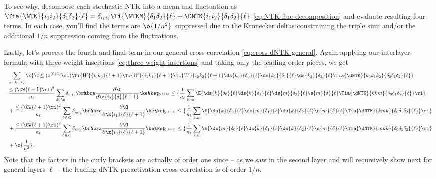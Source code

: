  To see why, decompose each stochastic NTK into a mean and fluctuation as $\Tia{\NTK}{i_1i_2}{\delta_1\delta_2}{\ell}=\delta_{i_1i_2}\Ti{\NTKM}{\delta_1\delta_2}{\ell}+\DNTK{i_1i_2}{\delta_1\delta_2}{\ell}$ \eqref{eq:NTK-fluc-decomposition} and evaluate resulting four terms. In each case, you'll find the terms are $\o{1/n^2}$ suppressed due to the  Kronecker deltas constraining the triple sum and/or the additional $1/n$ suppression coming from the fluctuations.






Lastly, let's process the fourth and final term in our general cross correlation \eqref{eq:cross-dNTK-general}. Again applying our interlayer formula with three weight insertions \eqref{eq:three-weight-insertions} and taking only the leading-order pieces,
we get
\begin{align}\label{eq:dNTK-cross-correlation-contribution-3}
&\sum_{k_0,k_1,k_2}\E{\O\!\le(z^{(\ell+1)}\ri)\Ti{W}{i_0 k_0}{\ell+1}\Ti{W}{i_1 k_1}{\ell+1}\Ti{W}{i_2 k_2}{\ell+1}\ds{k_0}{\delta_0}{\ell}\ds{k_1}{\delta_1}{\ell}\ds{k_2}{\delta_2}{\ell}\Tia{\dNTK}{k_0k_1k_2}{\delta_0\delta_1\delta_2}{\ell}}\, \notag \\
=&\frac{\le(\CW{\ell+1}\ri)^2}{n_{\ell}}\sum_{\delta_{}\in\D}\delta_{i_0i_1}\bra\!\!\!\bra\frac{\partial \O}{\partial \z{i_2}{\delta_{}}{\ell+1}} \ket\!\!\!\ket_{\!\!\!G^{(\ell+1)}}\le\{\frac{1}{n_{\ell}}\sum_{k,m}\E{\ds{k}{\delta_0}{\ell}\ds{k}{\delta_1}{\ell}\ds{m}{\delta_2}{\ell}\s{m}{\delta_{}}{\ell} \Tia{\dNTK}{kkm}{\delta_0\delta_1\delta_2}{\ell}}\ri\}\, \notag\\
&+\frac{\le(\CW{\ell+1}\ri)^2}{n_{\ell}}\sum_{\delta_{}\in\D}\delta_{i_0i_2}\bra\!\!\!\bra\frac{\partial \O}{\partial \z{i_1}{\delta_{}}{\ell+1}} \ket\!\!\!\ket_{\!\!\!G^{(\ell+1)}}\le\{\frac{1}{n_{\ell}}\sum_{k,m}\E{\ds{k}{\delta_0}{\ell}\ds{m}{\delta_1}{\ell}\ds{k}{\delta_2}{\ell}\s{m}{\delta_{}}{\ell}\Tia{\dNTK}{kmk}{\delta_0\delta_1\delta_2}{\ell}}\ri\}\, \notag\\
&+\frac{\le(\CW{\ell+1}\ri)^2}{n_{\ell}}\sum_{\delta_{}\in\D}\delta_{i_1i_2}\bra\!\!\!\bra\frac{\partial \O}{\partial \z{i_0}{\delta_{}}{\ell+1}} \ket\!\!\!\ket_{\!\!\!G^{(\ell+1)}}\le\{\frac{1}{n_{\ell}}\sum_{k,m}\E{\ds{m}{\delta_0}{\ell}\ds{k}{\delta_1}{\ell}\ds{k}{\delta_2}{\ell}\s{m}{\delta_{}}{\ell}\Tia{\dNTK}{mkk}{\delta_0\delta_1\delta_2}{\ell}}\ri\}\, \notag\\
&+\o{\frac{1}{n^2}}\, .
\end{align}
Note that the factors in the curly brackets are actually of order one since -- as we saw in the second layer and will recursively show next for general layers $\ell$ -- the leading dNTK-preactivation cross correlation is of order $1/n$. 
